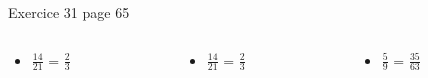 \documentclass[xcolor={dvipsnames}]{beamer}
\begin{document}
\begin{frame}
	
	\begin{block}{Exercice 31 page 65}
		
	\begin{columns}
		\begin{column}{0.25\textwidth}
			\begin{huge}
				\begin{itemize}
					\item $\frac{14}{21}$ = \pause $\frac{2}{3}$ \pause
					
					
					
					
				\end{itemize}	
			\end{huge}
			
		\end{column}
		
		\begin{column}{0.25\textwidth}
			\begin{huge}
				\begin{itemize}
					
					\item $\frac{14}{21}$ = \pause $\frac{2}{3}$ \pause
					
					
					
					
				\end{itemize}	
			\end{huge}
			
		\end{column}
	
		\begin{column}{0.25\textwidth}
			\begin{huge}
				\begin{itemize}
					\item $\frac{5}{9}$ = \pause $\frac{35}{63}$\pause
					
				\end{itemize}	
			\end{huge}
			
		\end{column}
	

\end{columns}
\end{block}
\end{frame}
\end{document}

